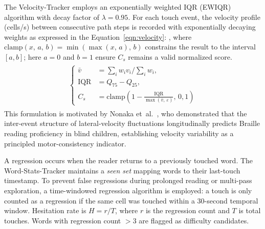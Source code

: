 \documentclass[conference]{IEEEtran}
\begin{document}
    The Velocity-Tracker employs an exponentially weighted IQR (EWIQR)
    algorithm with decay factor of $\lambda=0.95$. For each touch event,
    the velocity profile (cells/s) between consecutive path steps is
    recorded with exponentially decaying weights as expressed in the 
    Equation~\ref{eqn:velocity}:
    ,
    where $\mathrm{clamp}(x,\,a,\,b) = \min\!\left(\max(x,\,a),\,b\right)$
    constrains the result to the interval $[a, b]$; here $a = 0$ and
    $b = 1$ ensure $C_s$ remains a valid normalized score.
    \begin{align}
    \begin{split}
    \begin{cases}
        \bar{v} &= \textstyle\sum_i w_i v_i \big/ \sum_i w_i, \\
        \text{IQR} &= Q_{75} - Q_{25}, \\
        C_s &= \mathrm{clamp}\!\left(1 - \frac{\text{IQR}}
            {\max(\bar{v},\,\varepsilon)},\,0,1\right)
                 \label{eqn:velocity}
    \end{cases}
    \end{split}
    \end{align}
    This formulation is motivated by Nonaka et~al.~\cite{nonaka2021}, who
    demonstrated that the inter-event structure of lateral-velocity
    fluctuations longitudinally predicts Braille reading proficiency in
    blind children, establishing velocity variability as a principled
    motor-consistency indicator.


    A regression occurs when the reader returns to a previously touched word. The Word-Stats-Tracker maintains a \emph{seen set} mapping words to their last-touch timestamp. To prevent false regressions during prolonged reading or multi-pass exploration, a time-windowed regression algorithm is employed: a touch is only counted as a regression if the same cell was touched within a 30-second temporal window. Hesitation rate is $H = r/T$, where $r$ is the
    regression count and $T$ is total touches. Words with regression count
    $>3$ are flagged as difficulty candidates.
\end{document}
